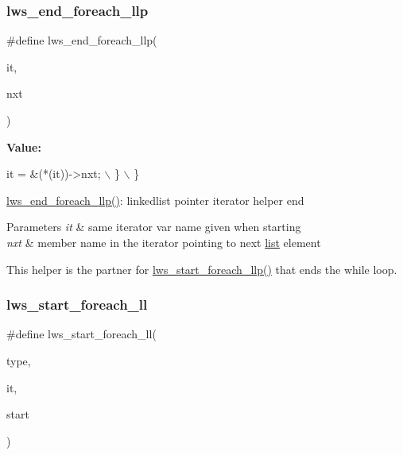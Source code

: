 \subsubsection{\texorpdfstring{lws\+\_\+end\+\_\+foreach\+\_\+llp}{lws\_end\_foreach\_llp}\hspace{0.1cm}{\footnotesize\ttfamily [6/6]}}
{\footnotesize\ttfamily \#define lws\+\_\+end\+\_\+foreach\+\_\+llp(\begin{DoxyParamCaption}\item[{}]{it,  }\item[{}]{nxt }\end{DoxyParamCaption})}

{\bfseries Value\+:}
\begin{DoxyCode}
it = &(*(it))->nxt; \(\backslash\)
    \} \(\backslash\)
\}
\end{DoxyCode}
\hyperlink{group__misc_gaba92c53b57f3e689f8568b02184a8d84}{lws\+\_\+end\+\_\+foreach\+\_\+llp()}\+: linkedlist pointer iterator helper end


\begin{DoxyParams}{Parameters}
{\em it} & same iterator var name given when starting \\
\hline
{\em nxt} & member name in the iterator pointing to next \hyperlink{protocollist-p}{list} element\\
\hline
\end{DoxyParams}
This helper is the partner for \hyperlink{group__misc_gad973ecfe2ac066ba0ea1ec3695d3e896}{lws\+\_\+start\+\_\+foreach\+\_\+llp()} that ends the while loop. \mbox{\label{group__misc_ga9f138b98c73782807d88e76c1c532dc2}} 
\subsubsection{\texorpdfstring{lws\+\_\+start\+\_\+foreach\+\_\+ll}{lws\_start\_foreach\_ll}\hspace{0.1cm}{\footnotesize\ttfamily [1/6]}}
{\footnotesize\ttfamily \#define lws\+\_\+start\+\_\+foreach\+\_\+ll(\begin{DoxyParamCaption}\item[{}]{type,  }\item[{}]{it,  }\item[{}]{start }\end{DoxyParamCaption})}


